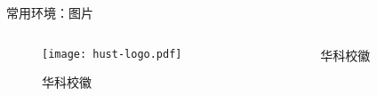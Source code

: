 \begin{frame}[fragile]{常用环境：图片}
\begin{columns}
\begin{column}{0.64\textwidth}
  \begin{texcode}[gobble=4, moretexcs={\graphicspath,\includegraphics},
      emph={[1]figure}, emph={[2]graphicx}]
    \usepackage{graphicx}
    \graphicspath{{./figures/}}

    \begin{figure}
      \centering
      \texttt{[image: hust-logo.pdf]}
      \caption{华科校徽}
      \label{fig:hust-logo}
    \end{figure}
  \end{texcode}
\end{column}
\pause
\begin{column}{0.28\textwidth}
  \begin{figure}
    \centering
    \caption{华科校徽}
    \label{fig:hust-logo_}
  \end{figure}
\end{column}
\end{columns}
\end{frame}



